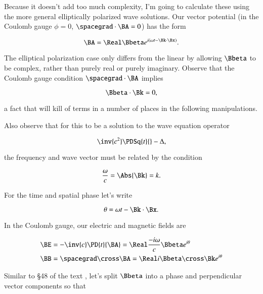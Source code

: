 Because it doesn't add too much complexity, I'm going to calculate these using the more general elliptically polarized wave solutions.  Our vector potential (in the Coulomb gauge $\phi = 0$, $\spacegrad \cdot \BA = 0$) has the form

\begin{equation}\label{eqn:relElectroDynProblemSet4:10}
\BA = \Real \Bbeta e^{i (\omega t - \Bk \cdot \Bx) }.
\end{equation}

The elliptical polarization case only differs from the linear by allowing $\Bbeta$ to be complex, rather than purely real or purely imaginary.  Observe that the Coulomb gauge condition $\spacegrad \cdot \BA$ implies

\begin{equation}\label{eqn:relElectroDynProblemSet4:30}
\Bbeta \cdot \Bk = 0,
\end{equation}

a fact that will kill of terms in a number of places in the following manipulations.

Also observe that for this to be a solution to the wave equation operator

\begin{equation}\label{eqn:relElectroDynProblemSet4:50}
\inv{c^2} \PDSq{t}{} - \Delta,
\end{equation}

the frequency and wave vector must be related by the condition

\begin{equation}\label{eqn:relElectroDynProblemSet4:70}
\frac{\omega}{c} = \Abs{\Bk} = k.
\end{equation}

For the time and spatial phase let's write

\begin{equation}\label{eqn:relElectroDynProblemSet4:90}
\theta = \omega t - \Bk \cdot \Bx.
\end{equation}

In the Coulomb gauge, our electric and magnetic fields are

\begin{align}\label{eqn:relElectroDynProblemSet4:110}
\BE &= -\inv{c}\PD{t}{\BA} = \Real \frac{-i\omega}{c} \Bbeta e^{i\theta} \\
\BB &= \spacegrad \cross \BA = \Real i \Bbeta \cross \Bk e^{i\theta}
\end{align}

Similar to \S 48 of the text \citep{landau1980classical}, let's split $\Bbeta$ into a phase and perpendicular vector components so that

